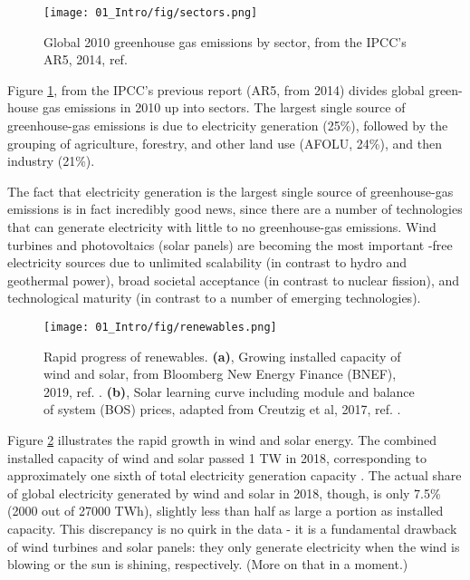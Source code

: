 \begin{figure}[h!]
	\centering
	\texttt{[image: 01\_Intro/fig/sectors.png]}
	\caption{Global 2010 greenhouse gas emissions by sector, from the IPCC's AR5, 2014, ref. \cite{IPCC2014}}
	\label{fig:sectors}
\end{figure}

Figure \ref{fig:sectors}, from the IPCC's previous report (AR5, from 2014)\cite{IPCC2014} divides global green-house gas emissions in 2010 up into sectors. The largest single source of greenhouse-gas emissions is due to electricity generation (25\%), followed by the grouping of agriculture, forestry, and other land use (AFOLU, 24\%), and then industry (21\%). 

The fact that electricity generation is the largest single source of greenhouse-gas emissions is in fact incredibly good news, since there are a number of technologies that can generate electricity with little to no greenhouse-gas emissions. Wind turbines and photovoltaics (solar panels) are becoming the most important -free electricity sources due to unlimited scalability (in contrast to hydro and geothermal power), broad societal acceptance (in contrast to nuclear fission), and technological maturity (in contrast to a number of emerging technologies)\cite{BNEF2018, Creutzig2017}. 
\begin{figure}[h!]
	\centering
	\texttt{[image: 01\_Intro/fig/renewables.png]}
	\caption{Rapid progress of renewables. \textbf{(a)}, Growing installed capacity of wind and solar, from Bloomberg New Energy Finance (BNEF), 2019, ref. . \textbf{(b)}, Solar learning curve including module and balance of system (BOS) prices, adapted from Creutzig et al, 2017, ref. .}
	\label{fig:renewables}
\end{figure}
Figure \ref{fig:renewables} illustrates the rapid growth in wind and solar energy. The combined installed capacity of wind and solar passed 1 TW\cite{BNEF2018} in 2018, corresponding to approximately one sixth of total electricity generation capacity \cite{IRENA2019}. The actual share of global electricity generated by wind and solar in 2018, though, is only 7.5\% (2000 out of 27000 TWh)\cite{Enerdata2019}, slightly less than half as large a portion as installed capacity. This discrepancy is no quirk in the data - it is a fundamental drawback of wind turbines and solar panels: they only generate electricity when the wind is blowing or the sun is shining, respectively. (More on that in a moment.)

